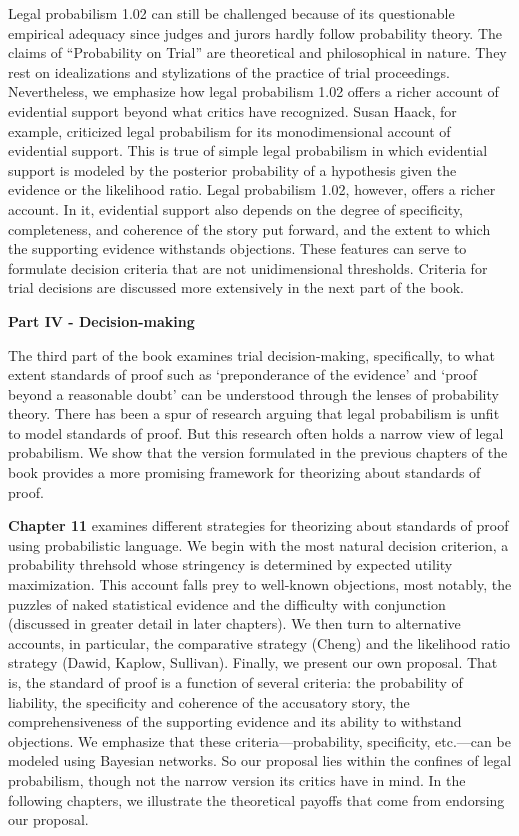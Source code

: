 \documentclass[
  10pt,
  dvipsnames,enabledeprecatedfontcommands]{scrartcl}
\begin{document}
Legal probabilism 1.02 can still be challenged because of its
questionable empirical adequacy since judges and jurors hardly follow
probability theory. The claims of ``Probability on Trial'' are
theoretical and philosophical in nature. They rest on idealizations and
stylizations of the practice of trial proceedings. Nevertheless, we
emphasize how legal probabilism 1.02 offers a richer account of
evidential support beyond what critics have recognized. Susan Haack, for
example, criticized legal probabilism for its monodimensional account of
evidential support. This is true of simple legal probabilism in which
evidential support is modeled by the posterior probability of a
hypothesis given the evidence or the likelihood ratio. Legal probabilism
1.02, however, offers a richer account. In it, evidential support also
depends on the degree of specificity, completeness, and coherence of the
story put forward, and the extent to which the supporting evidence
withstands objections. These features can serve to formulate decision
criteria that are not unidimensional thresholds. Criteria for trial
decisions are discussed more extensively in the next part of the book.

\vspace{3mm}

\noindent \textbf{Part IV - Decision-making}

\noindent The third part of the book examines trial decision-making,
specifically, to what extent standards of proof such as `preponderance
of the evidence' and `proof beyond a reasonable doubt' can be understood
through the lenses of probability theory. There has been a spur of
research arguing that legal probabilism is unfit to model standards of
proof. But this research often holds a narrow view of legal probabilism.
We show that the version formulated in the previous chapters of the book
provides a more promising framework for theorizing about standards of
proof.

\textbf{Chapter 11} examines different strategies for theorizing about
standards of proof using probabilistic language. We begin with the most
natural decision criterion, a probability threhsold whose stringency is
determined by expected utility maximization. This account falls prey to
well-known objections, most notably, the puzzles of naked statistical
evidence and the difficulty with conjunction (discussed in greater
detail in later chapters). We then turn to alternative accounts, in
particular, the comparative strategy (Cheng) and the likelihood ratio
strategy (Dawid, Kaplow, Sullivan). Finally, we present our own
proposal. That is, the standard of proof is a function of several
criteria: the probability of liability, the specificity and coherence of
the accusatory story, the comprehensiveness of the supporting evidence
and its ability to withstand objections. We emphasize that these
criteria---probability, specificity, etc.---can be modeled using
Bayesian networks. So our proposal lies within the confines of legal
probabilism, though not the narrow version its critics have in mind. In
the following chapters, we illustrate the theoretical payoffs that come
from endorsing our proposal.
\end{document}
